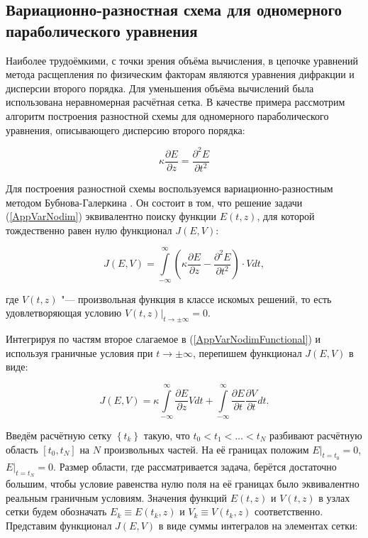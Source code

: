 \subsection{Вариационно-разностная схема для одномерного параболического уравнения}
\label{subsec:AppVarXZ}

Наиболее трудоёмкими, с точки зрения объёма вычисления, в цепочке уравнений
метода расщепления по физическим факторам являются уравнения дифракции и дисперсии второго порядка.
Для уменьшения объёма вычислений была использована неравномерная расчётная сетка.
В качестве примера рассмотрим алгоритм построения разностной схемы для одномерного
параболического уравнения, описывающего дисперсию второго порядка:

\begin{equation}\label{AppVarNodim}
\kappa\dfrac{\partial E}{\partial z} = \dfrac{\partial^2 E}{\partial t^2}
\end{equation}

Для построения разностной схемы воспользуемся вариационно-разностным методом Бубнова-Галеркина \cite{BahvalovChM}.
Он состоит в том, что решение задачи (\ref{AppVarNodim}) эквивалентно поиску функции $E(t, z)$,
для которой тождественно равен нулю функционал $J(E, V)$:

\begin{equation}\label{AppVarNodimFunctional}
J(E, V) = \int\limits_{-\infty}^{\infty} \left(\kappa\dfrac{\partial E}{\partial z} -
          \dfrac{\partial^2 E}{\partial t^2}\right) \cdot V dt,
\end{equation}

\noindent где $V(t, z)$ "--- произвольная функция в классе искомых решений, то есть
удовлетворяющая условию $\left. V(t, z)\right|_{t\rightarrow\pm\infty} = 0$.

Интегрируя по частям второе слагаемое в (\ref{AppVarNodimFunctional}) и используя граничные
условия при  $t\rightarrow\pm\infty$, перепишем функционал $J(E, V)$ в виде:

\begin{equation}
J(E, V) = \kappa\int\limits_{-\infty}^{\infty} \dfrac{\partial E}{\partial z} V dt +
          \int\limits_{-\infty}^{\infty} \dfrac{\partial E}{\partial t}\dfrac{\partial V}{\partial t} dt.
\end{equation}

Введём расчётную сетку $\left\{ t_k \right\}$ такую, что $t_0 < t_1 < \ldots < t_N$ разбивают
расчётную область $\left[t_0, t_N\right]$ на $N$ произвольных частей. На её границах положим
$\left. E \right|_{t = t_0} = 0$, $\left. E \right|_{t = t_N} = 0$. Размер области, где
рассматривается задача, берётся достаточно большим, чтобы условие равенства нулю поля на её границах
было эквивалентно реальным граничным условиям. Значения функций
$E(t, z)$ и $V(t, z)$ в узлах сетки будем обозначать $E_k \equiv E(t_k, z)$ и $V_k \equiv V(t_k, z)$
соответственно. Представим функционал $J(E, V)$ в виде суммы интегралов на элементах сетки:

